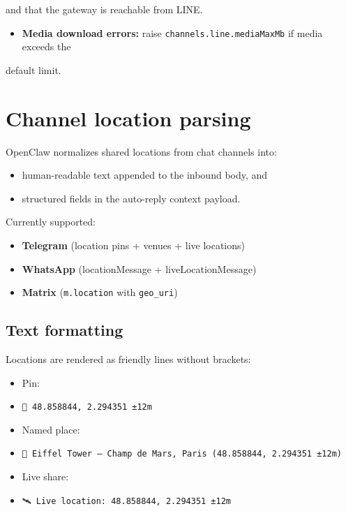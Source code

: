 and that the gateway is reachable from LINE.
\begin{itemize}
  \item \textbf{Media download errors:} raise \texttt{channels.line.mediaMaxMb} if media exceeds the
\end{itemize}

default limit.


\clearpage

\section{Channel location parsing}


OpenClaw normalizes shared locations from chat channels into:

\begin{itemize}
  \item human-readable text appended to the inbound body, and
  \item structured fields in the auto-reply context payload.
\end{itemize}


Currently supported:

\begin{itemize}
  \item \textbf{Telegram} (location pins + venues + live locations)
  \item \textbf{WhatsApp} (locationMessage + liveLocationMessage)
  \item \textbf{Matrix} (\texttt{m.location} with \texttt{geo\_uri})
\end{itemize}


\subsection{Text formatting}


Locations are rendered as friendly lines without brackets:

\begin{itemize}
  \item Pin:
  \item \texttt{📍 48.858844, 2.294351 ±12m}
  \item Named place:
  \item \texttt{📍 Eiffel Tower — Champ de Mars, Paris (48.858844, 2.294351 ±12m)}
  \item Live share:
  \item \texttt{🛰 Live location: 48.858844, 2.294351 ±12m}
\end{itemize}


